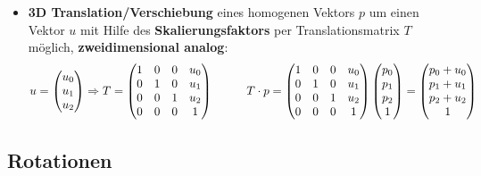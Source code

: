 \begin{itemize}
	\item \textbf{3D Translation/Verschiebung} eines homogenen Vektors $p$ um einen Vektor $u$ mit Hilfe des \textbf{Skalierungsfaktors} per Translationsmatrix $T$ möglich, \textbf{zweidimensional analog}:
	$$u = \begin{pmatrix}
		u_0 \\ u_1 \\ u_2
	\end{pmatrix} \Rightarrow T = \begin{pmatrix}
		1 & 0 & 0 & u_0\\
		0 & 1 & 0 & u_1\\
		0 & 0 & 1 & u_2\\
		0 & 0 & 0 & 1
	\end{pmatrix}
	\hspace*{1cm}T \cdot p = \begin{pmatrix}
		1 & 0 & 0 & u_0\\
		0 & 1 & 0 & u_1\\
		0 & 0 & 1 & u_2\\
		0 & 0 & 0 & 1
	\end{pmatrix} \begin{pmatrix}p_0 \\ p_1 \\ p_2 \\ 1\end{pmatrix} = \begin{pmatrix}
		p_0 + u_0 \\ p_1 + u_1 \\ p_2 + u_2 \\ 1
	\end{pmatrix}$$
\end{itemize}

\subsection{Rotationen}%
\label{gtrans:sub:rotationen}

